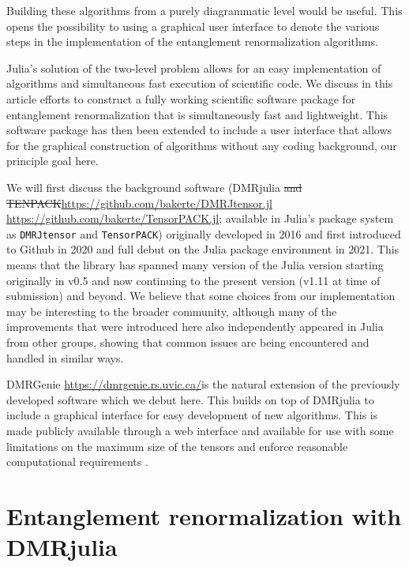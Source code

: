 \documentclass{juliacon}
\providecommand{\DIFaddtex}[1]{{\protect\color{blue}\uwave{#1}}} %
\providecommand{\DIFdeltex}[1]{{\protect\color{red}\sout{#1}}}                      %
\providecommand{\DIFaddbegin}{} %
\providecommand{\DIFaddend}{} %
\providecommand{\DIFdelbegin}{} %
\providecommand{\DIFdelend}{} %
\providecommand{\DIFadd}[1]{\texorpdfstring{\DIFaddtex{#1}}{#1}} %
\providecommand{\DIFdel}[1]{\texorpdfstring{\DIFdeltex{#1}}{}} %
\begin{document}
Building these algorithms from a purely diagrammatic level would be useful. This opens the possibility to using a graphical user interface to denote the various steps in the implementation of the entanglement renormalization algorithms.

Julia's solution of the two-level problem allows for an easy implementation of algorithms and simultaneous fast execution of scientific code. We discuss in this article efforts to construct a fully working scientific software package for entanglement renormalization that is simultaneously fast and lightweight. This software package has then been extended to include a user interface that allows for the graphical construction of algorithms without any coding background, our principle goal here.

We will first discuss the background software (DMRjulia \DIFdelbegin \DIFdel{and TENPACK}\DIFdelend \DIFaddbegin \url{https://github.com/bakerte/DMRJtensor.jl} \DIFadd{and TENPACK }\url{https://github.com/bakerte/TensorPACK.jl}\DIFaddend ; available in Julia's package system as {\tt DMRJtensor} and {\tt TensorPACK}) originally developed in 2016 and first introduced to Github in 2020 and full debut on the Julia package environment in 2021. This means that the library has spanned many version of the Julia version starting originally in v0.5 and now continuing to the present version (v1.11 at time of submission) and beyond. We believe that some choices from our implementation may be interesting to the broader community, although many of the improvements that were introduced here also independently appeared in Julia from other groups, showing that common issues are being encountered and handled in similar ways.

DMRGenie \DIFaddbegin \DIFadd{(located at }\url{https://dmrgenie.rs.uvic.ca/}\DIFadd{) }\DIFaddend is the natural extension of the previously developed software which we debut here. This builds on top of DMRjulia to include a graphical interface for easy development of new algorithms. This is made publicly available through a web interface and available for use with some limitations on the maximum size of the tensors and enforce reasonable computational requirements \cite{dmrgenie}.



\section{Entanglement renormalization with DMRjulia}
\end{document}
